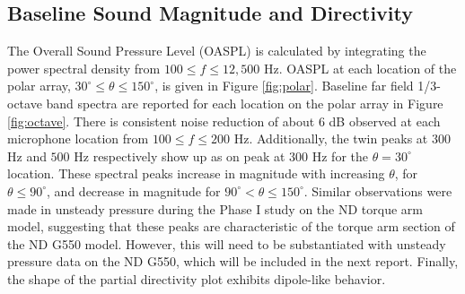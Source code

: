 \subsection{Baseline Sound Magnitude and Directivity}
The Overall Sound Pressure Level (OASPL) is calculated by integrating the power spectral density from $100 \leq f \leq 12,500$ Hz. OASPL at each location of the polar array, $30^\circ \leq \theta \leq 150^\circ$, is given in Figure \ref{fig:polar}. Baseline far field 1/3-octave band spectra are reported for each location on the polar array in Figure \ref{fig:octave}.
There is consistent noise reduction of about 6 dB observed at each microphone location from $100 \leq f \leq 200$ Hz. Additionally, the twin peaks at $300$ Hz and $500$ Hz respectively show up as on peak at $300$ Hz for the $\theta = 30^\circ$ location. These spectral peaks increase in magnitude with increasing $\theta$, for $\theta \leq 90^\circ$, and decrease in magnitude for $90^\circ < \theta \leq 150^\circ$. Similar observations were made in unsteady pressure during the Phase I study on the ND torque arm model, suggesting that these peaks are characteristic of the torque arm section of the ND G550 model. However, this will need to be substantiated with unsteady pressure data on the ND G550, which will be included in the next report. Finally, the shape of the partial directivity plot exhibits dipole-like behavior.

